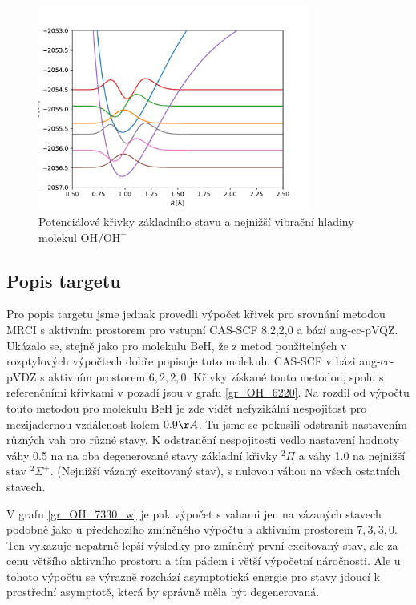 \begin{figure}
\centering
\includegraphics[width=0.8\textwidth]{../img/OH-vibr1.pdf}
\caption{Potenciálové křivky základního stavu a nejnižší vibrační hladiny molekul $\mathrm{OH/OH^-}$ \label{VibrOH1}}
\end{figure}



\subsection{Popis targetu}
Pro popis targetu jsme jednak provedli výpočet křivek pro srovnání metodou MRCI s 
aktivním prostorem pro vstupní CAS-SCF 8,2,2,0 a bází aug-cc-pVQZ. Ukázalo se, stejně 
jako pro molekulu BeH, že z metod použitelných v rozptylových výpočtech dobře popisuje 
tuto molekulu CAS-SCF v bázi aug-cc-pVDZ s aktivním prostorem $6,2,2,0$. Křivky  
získané touto metodou, spolu s referenčními křivkami v pozadí jsou v grafu 
\ref{gr_OH_6220}. Na rozdíl od výpočtu touto metodou pro molekulu BeH je zde vidět 
nefyzikální nespojitost pro mezijadernou vzdálenost kolem $0.9\AA$. Tu jsme se 
pokusili odstranit nastavením různých vah pro různé stavy. K odstranění nespojitosti 
vedlo nastavení hodnoty váhy 0.5 na na oba degenerované stavy základní křivky $^2\Pi$ 
a váhy 1.0 na nejnižší stav  $^2\Sigma^+$. (Nejnižší vázaný excitovaný stav), s 
nulovou váhou na všech ostatních stavech.

V grafu \ref{gr_OH_7330_w} je pak výpočet s vahami jen na vázaných stavech podobně 
jako u předchozího zmíněného výpočtu a aktivním prostorem $7,3,3,0$. Ten vykazuje 
nepatrně lepší výsledky pro zmíněný první excitovaný stav, ale za cenu většího 
aktivního prostoru a tím pádem i větší výpočetní náročnosti. Ale u tohoto výpočtu se 
výrazně rozchází asymptotická energie pro stavy jdoucí k prostřední asymptotě, která 
by správně měla být degenerovaná.

